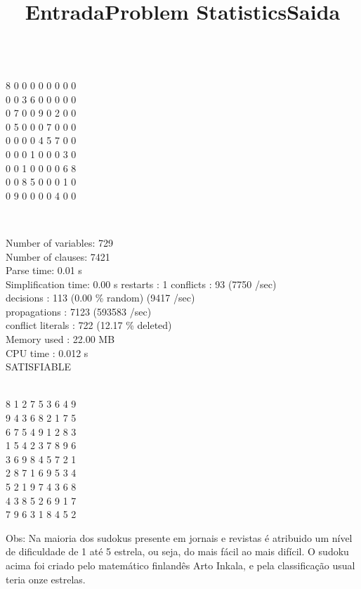 \documentclass[a4paper]{article}
\begin{document}
\newpage

\begin{center}
\title{\large Entrada}\\
8  0  0  0  0  0  0  0  0  \\
0  0  3  6  0  0  0  0  0  \\
0  7  0  0  9  0  2  0  0  \\
0  5  0  0  0  7  0  0  0  \\
0  0  0  0  4  5  7  0  0  \\
0  0  0  1  0  0  0  3  0  \\
0  0  1  0  0  0  0  6  8  \\
0  0  8  5  0  0  0  1  0  \\
0  9  0  0  0  0  4  0  0  \\
\end{center}
\begin{center}
\title{\large Problem Statistics}\\

\end{center}
Number of variables:           729 \\
Number of clauses:           7421 \\
Parse time:                   0.01 s\\
Simplification time:          0.00 s 
restarts              : 1
conflicts             : 93             (7750 /sec)\\
decisions             : 113            (0.00 \% random) (9417 /sec)\\
propagations          : 7123           (593583 /sec)\\
conflict literals     : 722            (12.17 \% deleted)\\
Memory used           : 22.00 MB\\
CPU time              : 0.012 s\\
SATISFIABLE\\

\begin{center}
\title{\large Saida}\\
8  1  2  7  5  3  6  4  9  \\
9  4  3  6  8  2  1  7  5  \\
6  7  5  4  9  1  2  8  3  \\
1  5  4  2  3  7  8  9  6  \\
3  6  9  8  4  5  7  2  1  \\
2  8  7  1  6  9  5  3  4  \\
5  2  1  9  7  4  3  6  8  \\
4  3  8  5  2  6  9  1  7  \\
7  9  6  3  1  8  4  5  2  \\
\end{center}

Obs: Na maioria dos sudokus presente em jornais e revistas é atribuido um nível de dificuldade de 1 até 5 estrela, ou seja, do mais fácil ao mais difícil. O sudoku acima foi criado pelo matemático finlandês Arto Inkala, e pela classificação usual teria onze estrelas.
\end{document}
